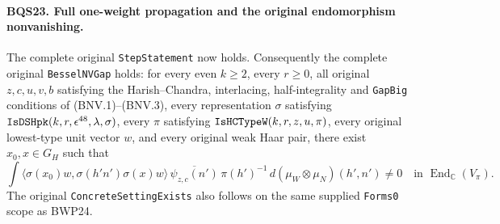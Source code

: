 \documentclass[11pt,a4paper]{article}
\numberwithin{equation}{section}
\theoremstyle{remark}\newtheorem{remark}[theorem]{Remark}
\begin{document}
\paragraph{BQS23. Full one-weight propagation and the original endomorphism nonvanishing.}
\label{claim:BQS23}
The complete original \texttt{Step\allowbreak Statement} now holds.
Consequently the complete original \texttt{Bessel\allowbreak NVGap} holds:
for every even $k\ge2$, every $r\ge0$, all original
$z,c,u,v,b$ satisfying the Harish--Chandra, interlacing,
half-integrality and \texttt{Gap\allowbreak Big} conditions of (BNV.1)--(BNV.3),
every representation $\sigma$ satisfying
$\texttt{Is\allowbreak DSHpk}(k,r,\epsilon^{48},\lambda,\sigma)$,
every $\pi$ satisfying $\texttt{Is\allowbreak HCType\allowbreak W}(k,r,z,u,\pi)$,
every original lowest-type unit vector $w$, and every original
weak Haar pair, there exist $x_0,x\in G_H$ such that
\[
 \int
 \langle\sigma(x_0)w,\sigma(h'n')\sigma(x)w\rangle\,
    \overline{\psi_{z,c}(n')}\,\pi(h')^{-1}\,
                  d(\mu_W\otimes\mu_N)(h',n')\ne0
       \quad\text{in }\operatorname{End}_{\mathbb C}(V_\pi).
 \tag{BQS.68}
\]
The original \texttt{Concrete\allowbreak Setting\allowbreak Exists} also follows on the
same supplied \texttt{Forms0} scope as BWP24.
\end{document}

